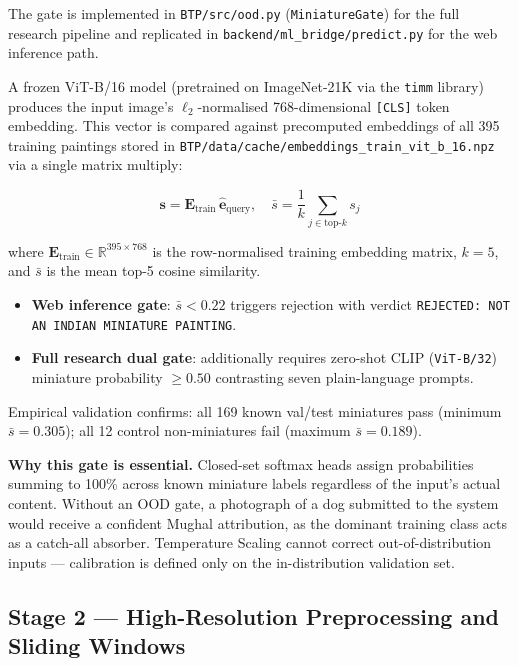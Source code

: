 \documentclass[12pt, a4paper, twoside]{article}
\begin{document}
The gate is implemented in \texttt{BTP/src/ood.py} (\texttt{MiniatureGate}) for the full research pipeline and replicated in \texttt{backend/ml\_bridge/predict.py} for the web inference path.

A frozen ViT-B/16 model (pretrained on ImageNet-21K via the \texttt{timm} library) produces the input image's ${\ell_2}$-normalised 768-dimensional \texttt{[CLS]} token embedding. This vector is compared against precomputed embeddings of all 395 training paintings stored in \texttt{BTP/data/cache/embeddings\_train\_vit\_b\_16.npz} via a single matrix multiply:

\begin{equation}
  \mathbf{s} = \mathbf{E}_{\text{train}}\, \hat{\mathbf{e}}_{\text{query}}, \quad
  \bar{s} = \frac{1}{k} \sum_{j \in \text{top-}k} s_j
  \label{eq:ood}
\end{equation}

where $\mathbf{E}_{\text{train}} \in \mathbb{R}^{395 \times 768}$ is the row-normalised training embedding matrix, $k = 5$, and $\bar{s}$ is the mean top-5 cosine similarity.

\begin{itemize}
  \item \textbf{Web inference gate}: $\bar{s} < 0.22$ triggers rejection with verdict \texttt{REJECTED: NOT AN INDIAN MINIATURE PAINTING}.
  \item \textbf{Full research dual gate}: additionally requires zero-shot CLIP (\texttt{ViT-B/32}) miniature probability $\geq 0.50$ contrasting seven plain-language prompts.
\end{itemize}

Empirical validation confirms: all 169 known val/test miniatures pass (minimum $\bar{s} = 0.305$); all 12 control non-miniatures fail (maximum $\bar{s} = 0.189$).

\begin{importantbox}
  \textbf{Why this gate is essential.} Closed-set softmax heads assign probabilities summing to 100\% across known miniature labels regardless of the input's actual content. Without an OOD gate, a photograph of a dog submitted to the system would receive a confident Mughal attribution, as the dominant training class acts as a catch-all absorber. Temperature Scaling cannot correct out-of-distribution inputs — calibration is defined only on the in-distribution validation set.
\end{importantbox}

\subsection{Stage 2 — High-Resolution Preprocessing and Sliding Windows}
\end{document}
